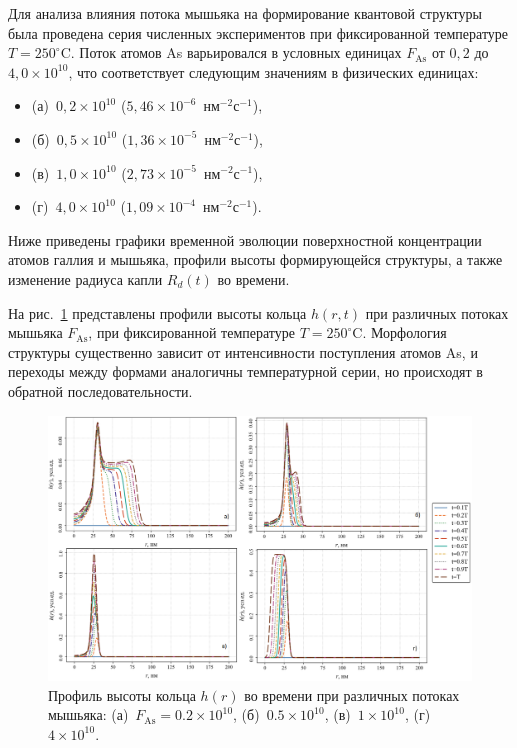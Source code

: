 \documentclass[14pt,oneside]{extarticle}
\begin{document}
Для анализа влияния потока мышьяка на формирование квантовой структуры была проведена серия численных экспериментов при фиксированной температуре $T = 250^\circ$C. Поток атомов As варьировался в условных единицах $F_{\text{As}}$ от $0{,}2$ до $4{,}0 \times 10^{10}$, что соответствует следующим значениям в физических единицах:

\begin{itemize}
    \item (а)~$0{,}2 \times 10^{10}$ ($5{,}46 \times 10^{-6}$~нм$^{-2}$с$^{-1}$),
    \item (б)~$0{,}5 \times 10^{10}$ ($1{,}36 \times 10^{-5}$~нм$^{-2}$с$^{-1}$),
    \item (в)~$1{,}0 \times 10^{10}$ ($2{,}73 \times 10^{-5}$~нм$^{-2}$с$^{-1}$),
    \item (г)~$4{,}0 \times 10^{10}$ ($1{,}09 \times 10^{-4}$~нм$^{-2}$с$^{-1}$).
\end{itemize}

Ниже приведены графики временной эволюции поверхностной концентрации атомов галлия и мышьяка, профили высоты формирующейся структуры, а также изменение радиуса капли $R_d(t)$ во времени.

На рис.~\ref{fig:h_flux_2} представлены профили высоты кольца $h(r, t)$ при различных потоках мышьяка $F_{\text{As}}$, при фиксированной температуре $T = 250^\circ$C. Морфология структуры существенно зависит от интенсивности поступления атомов As, и переходы между формами аналогичны температурной серии, но происходят в обратной последовательности.

\begin{figure}[H]
    \begin{center}
    \includegraphics[width=15cm]{images/h_t_2.png}
    \caption{\label{fig:h_flux_2} Профиль высоты кольца $h(r)$ во времени при различных потоках мышьяка: (а)~$F_{\text{As}} = 0.2 \times 10^{10}$, (б)~$0.5 \times 10^{10}$, (в)~$1 \times 10^{10}$, (г)~$4 \times 10^{10}$.}
    \end{center}
\end{figure}
\end{document}
